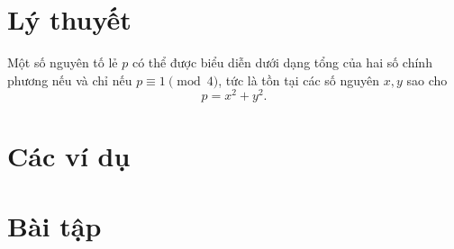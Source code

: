 \documentclass[../../imo-training-open-book.tex]{subfiles}
\begin{document}
\section{Lý thuyết}

\begin{theorem*}
    \label{theorem:fermat-sums-of-two-squares-theorem}
    Một số nguyên tố lẻ \( p \) có thể được biểu diễn dưới dạng tổng của hai số chính phương nếu và chỉ nếu \( p \equiv 1 \pmod{4} \),
    tức là tồn tại các số nguyên \( x, y \) sao cho
    \[
        p = x^2 + y^2.
    \]
\end{theorem*}

\newpage

\section{Các ví dụ}



\newpage

\section{Bài tập}

\newpage
\end{document}
